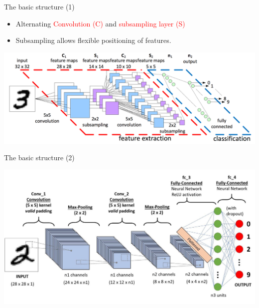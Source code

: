 \documentclass[default, aspectratio=169]{beamer}
\begin{document}
	\begin{frame}{The basic structure (1)}
		\begin{itemize}
			\item Alternating \textcolor{red}{Convolution (C)} and \textcolor{red}{subsampling layer (S)}
			\item Subsampling allows flexible positioning of features.
		\end{itemize}
		\begin{center}
			\includegraphics[keepaspectratio, scale=0.23]{pic/CNN_structure_3.png}
		\end{center}
	\end{frame}
	\begin{frame}{The basic structure (2)}
		\begin{center}
			\includegraphics[keepaspectratio, scale=0.25]{pic/CNN_structure_a.jpeg}
		\end{center}
	\end{frame}
\end{document}
